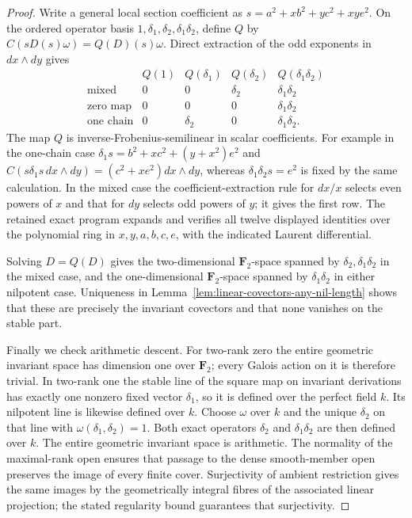 \begin{proof}
Write a general local section coefficient as
$s=a^2+xb^2+yc^2+xye^2$. On the ordered operator basis
$1,\delta_1,\delta_2,\delta_1\delta_2$, define $Q$ by
$C(sD(s)\omega)=Q(D)(s)\omega$.
Direct extraction of the odd exponents in $dx\wedge dy$ gives
\begin{equation}\label{eq:nonordinary-Cartier-table}
\begin{array}{c|cccc}
 &Q(1)&Q(\delta_1)&Q(\delta_2)&Q(\delta_1\delta_2)\\\hline
 \text{mixed}&0&0&\delta_2&\delta_1\delta_2\\
 \text{zero map}&0&0&0&\delta_1\delta_2\\
 \text{one chain}&0&\delta_2&0&\delta_1\delta_2.
\end{array}
\end{equation}
The map $Q$ is inverse-Frobenius-semilinear in scalar coefficients.
For example in the one-chain case
$\delta_1s=b^2+xc^2+(y+x^2)e^2$ and
$C(s\delta_1s\,dx\wedge dy)=(c^2+xe^2)dx\wedge dy$,
whereas $\delta_1\delta_2s=e^2$ is fixed by the same calculation.
In the mixed case the coefficient-extraction rule for $dx/x$ selects
even powers of $x$ and that for $dy$ selects odd powers of $y$;
it gives the first row. The retained exact program
 expands and verifies
all twelve displayed identities over the polynomial ring in
$x,y,a,b,c,e$, with the indicated Laurent differential.

Solving $D=Q(D)$ gives the two-dimensional $\mathbf F_2$-space
spanned by $\delta_2,\delta_1\delta_2$ in the mixed case, and the
one-dimensional $\mathbf F_2$-space spanned by
$\delta_1\delta_2$ in either nilpotent case.
Uniqueness in Lemma~\ref{lem:linear-covectors-any-nil-length}
shows that these are precisely the invariant covectors and that
none vanishes on the stable part.

Finally we check arithmetic descent. For two-rank zero the entire
geometric invariant space has dimension one over $\mathbf F_2$;
every Galois action on it is therefore trivial. In two-rank one the
stable line of the square map on invariant derivations has exactly
one nonzero fixed vector $\delta_1$, so it is defined over the
perfect field $k$. Its nilpotent line is likewise defined over $k$.
Choose $\omega$ over $k$ and the unique $\delta_2$ on that line with
$\omega(\delta_1,\delta_2)=1$.
Both exact operators $\delta_2$ and $\delta_1\delta_2$ are then
defined over $k$. The entire geometric invariant space is arithmetic.
The normality of the maximal-rank open ensures that passage to the
dense smooth-member open preserves the image of every finite cover.
Surjectivity of ambient restriction gives the same images by the
geometrically integral fibres of the associated linear projection;
the stated regularity bound guarantees that surjectivity.
\end{proof}

